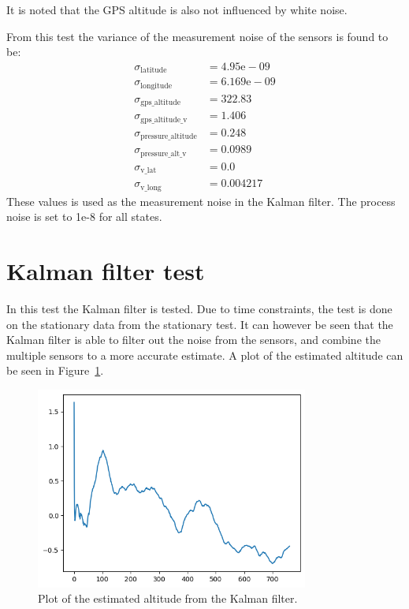 It is noted that the GPS altitude is also not influenced by white noise.

From this test the variance of the measurement noise of the sensors is found to be:
\begin{align}
    \sigma_{\text{latitude}} &= 4.95\mathrm{e}-09\nonumber\\
    \sigma_{\text{longitude}} &= 6.169\mathrm{e}-09\nonumber\\
    \sigma_{\text{gps\_altitude}} &= 322.83\nonumber \\
    \sigma_{\text{gps\_altitude\_v}} &= 1.406 \nonumber\\
    \sigma_{\text{pressure\_altitude}} &= 0.248 \nonumber\\
    \sigma_{\text{pressure\_alt\_v}} &= 0.0989\nonumber\\
    \sigma_{\text{v\_lat}} &= 0.0\nonumber\\
    \sigma_{\text{v\_long}} &= 0.004217 \nonumber
\end{align}
These values is used as the measurement noise in the Kalman filter.
The process noise is set to 1e-8 for all states.

\section{Kalman filter test}\label{sec:kalman-filter-test}
In this test the Kalman filter is tested.
Due to time constraints, the test is done on the stationary data from the stationary test.
It can however be seen that the Kalman filter is able to filter out the noise from the sensors, and combine the multiple sensors to a more accurate estimate.
A plot of the estimated altitude can be seen in Figure~\ref{fig:kalman-filter-test}.

\begin{figure}[H]
    \centering
    \includegraphics[width=0.8\textwidth]{chapters/05Results/figures/filtered_alt_only}
    \caption{Plot of the estimated altitude from the Kalman filter.}
    \label{fig:kalman-filter-test}
\end{figure}

